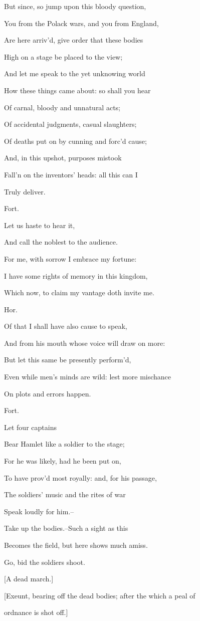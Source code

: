 \documentclass[12pt]{book}
\begin{document}
But since, so jump upon this bloody question,

You from the Polack wars, and you from England,

Are here arriv'd, give order that these bodies

High on a stage be placed to the view;

And let me speak to the yet unknowing world

How these things came about: so shall you hear

Of carnal, bloody and unnatural acts;

Of accidental judgments, casual slaughters;

Of deaths put on by cunning and forc'd cause;

And, in this upshot, purposes mistook

Fall'n on the inventors' heads: all this can I

Truly deliver.



Fort.

Let us haste to hear it,

And call the noblest to the audience.

For me, with sorrow I embrace my fortune:

I have some rights of memory in this kingdom,

Which now, to claim my vantage doth invite me.



Hor.

Of that I shall have also cause to speak,

And from his mouth whose voice will draw on more:

But let this same be presently perform'd,

Even while men's minds are wild: lest more mischance

On plots and errors happen.



Fort.

Let four captains

Bear Hamlet like a soldier to the stage;

For he was likely, had he been put on,

To have prov'd most royally: and, for his passage,

The soldiers' music and the rites of war

Speak loudly for him.--

Take up the bodies.--Such a sight as this

Becomes the field, but here shows much amiss.

Go, bid the soldiers shoot.



[A dead march.]



[Exeunt, bearing off the dead bodies; after the which a peal of

ordnance is shot off.]
\end{document}
